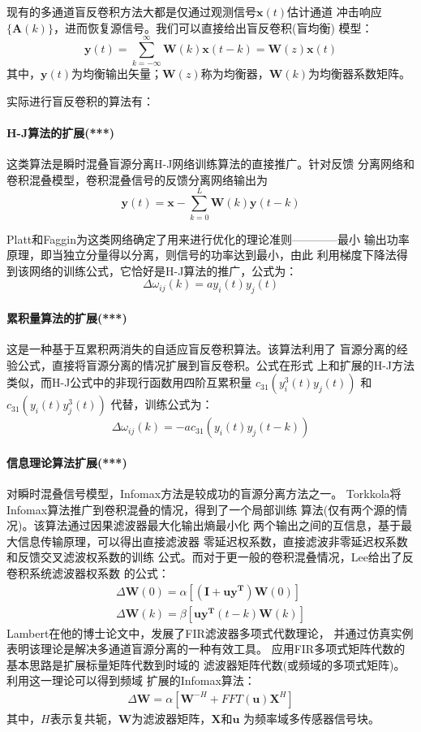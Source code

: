 	现有的多通道盲反卷积方法大都是仅通过观测信号$\bm{x}(t)$估计通道
冲击响应$\{\bm{A}(k)\}$，进而恢复源信号。我们可以直接给出盲反卷积(盲均衡)
模型：
\begin{equation}
\bm{y}(t) = \sum^\infty_{k=-\infty}\bm{W}(k)\bm{x}(t-k)=\bm{W}(z)\bm{x}(t)
\end{equation}
其中，$\bm{y}(t)$为均衡输出矢量；$\bm{W}(z)$称为均衡器，$\bm{W}(k)$为均衡器系数矩阵。

实际进行盲反卷积的算法有：
\paragraph*{H-J算法的扩展(***)}
这类算法是瞬时混叠盲源分离H-J网络训练算法的直接推广。针对反馈
分离网络和卷积混叠模型，卷积混叠信号的反馈分离网络输出为
\begin{equation}
\bm{y}(t)=\bm{x}-\sum^{L}_{k=0}\bm{W}(k)\bm{y}(t-k)
\end{equation}

Platt和Faggin为这类网络确定了用来进行优化的理论准则————最小
输出功率原理，即当独立分量得以分离，则信号的功率达到最小，由此
利用梯度下降法得到该网络的训练公式，它恰好是H-J算法的推广，公式为：
\begin{equation}
\Delta\omega_{ij}(k)=a y_i(t)y_j(t)
\end{equation}
\paragraph*{累积量算法的扩展(***)}
这是一种基于互累积两消失的自适应盲反卷积算法。该算法利用了
盲源分离的经验公式，直接将盲源分离的情况扩展到盲反卷积。公式在形式
上和扩展的H-J方法类似，而H-J公式中的非现行函数用四阶互累积量
$c_{31}(y_i^3(t)y_j(t))$ 和 $c_{31}(y_i(t)y_j^3(t))$
代替，训练公式为：
\begin{equation}
\Delta\omega_{ij}(k)=-ac_{31}(y_i(t)y_j(t-k))
\end{equation}
\paragraph*{信息理论算法扩展(***)}
对瞬时混叠信号模型，Infomax方法是较成功的盲源分离方法之一。
Torkkola将Infomax算法推广到卷积混叠的情况，得到了一个局部训练
算法(仅有两个源的情况)。该算法通过因果滤波器最大化输出熵最小化
两个输出之间的互信息，基于最大信息传输原理，可以得出直接滤波器
零延迟权系数，直接滤波非零延迟权系数和反馈交叉滤波权系数的训练
公式。而对于更一般的卷积混叠情况，Lee给出了反卷积系统滤波器权系数
的公式：
\begin{eqnarray}
\Delta\bm{W}(0)	= \alpha [\bm{(I+uy^T)W}(0)] \\
\Delta\bm{W}(k)	= \beta [\bm{uy^T}(t-k)\bm{W}(k)]
\end{eqnarray}
Lambert在他的博士论文中，发展了FIR滤波器多项式代数理论，
并通过仿真实例表明该理论是解决多通道盲源分离的一种有效工具。
应用FIR多项式矩阵代数的基本思路是扩展标量矩阵代数到时域的
滤波器矩阵代数(或频域的多项式矩阵)。利用这一理论可以得到频域
扩展的Infomax算法：
\begin{eqnarray}
\Delta\bm{W} = \alpha [\bm{W}^{-H}+FFT(\bm{u})\bm{X}^H]
\end{eqnarray}
其中，$H$表示复共轭，$\bm{W}$为滤波器矩阵，$\bm{X}$和$\bm{u}$
为频率域多传感器信号块。

